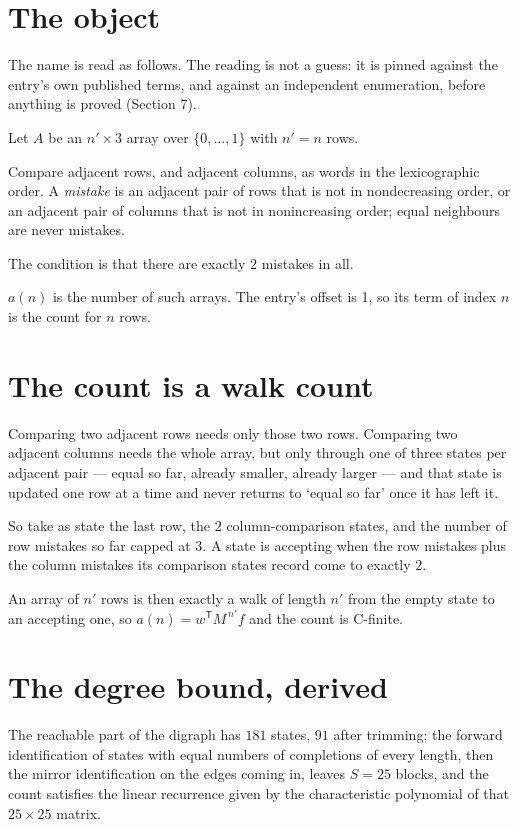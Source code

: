 \documentclass[11pt]{article}
\theoremstyle{definition}
\begin{document}
\section{The object}

The name is read as follows. The reading is not a guess: it is pinned against the entry's own published terms, and against an independent enumeration, before anything is proved (Section 7).

Let $A$ be an $n' \times 3$ array over $\{0,\dots,1\}$ with $n' = n$ rows.

Compare adjacent rows, and adjacent columns, as words in the lexicographic order. A {\itshape mistake} is an adjacent pair of rows that is not in nondecreasing order, or an adjacent pair of columns that is not in nonincreasing order; equal neighbours are never mistakes.

The condition is that there are exactly $2$ mistakes in all.

$a(n)$ is the number of such arrays. The entry's offset is 1, so its term of index $n$ is the count for $n$ rows.

\section{The count is a walk count}

Comparing two adjacent rows needs only those two rows. Comparing two adjacent columns needs the whole array, but only through one of three states per adjacent pair --- equal so far, already smaller, already larger --- and that state is updated one row at a time and never returns to `equal so far' once it has left it.

So take as state the last row, the $2$ column-comparison states, and the number of row mistakes so far capped at $3$. A state is accepting when the row mistakes plus the column mistakes its comparison states record come to exactly $2$.

An array of $n'$ rows is then exactly a walk of length $n'$ from the empty state to an accepting one, so $a(n) = w^{\mathsf T}M^{\,n'}f$ and the count is C-finite.

\section{The degree bound, derived}

The reachable part of the digraph has $181$ states, $91$ after trimming; the forward identification of states with equal numbers of completions of every length, then the mirror identification on the edges coming in, leaves $S = 25$ blocks, and the count satisfies the linear recurrence given by the characteristic polynomial of that $25\times25$ matrix.
\end{document}
